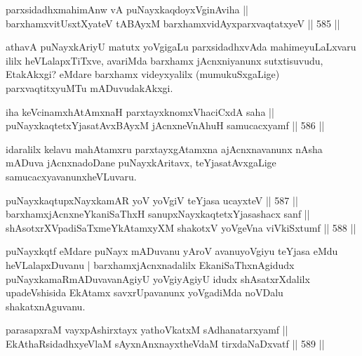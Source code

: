 \begin{shl}
parxsidadhxmahimAnw vA puNayxkaqdoyxVginAviha || \\
barxhamxvitUsxtXyateV tABAyxM barxhamxvidAyxparxvaqtatxyeV \hfill || 585 ||  
\end{shl}

\begin{artha}
athavA puNayxkAriyU matutx yoVgigaLu parxsidadhxvAda mahimeyuLaLxvaru
ililx heVLalapxTiTxve, avariMda barxhamx jAcnxniyanunx sutxtisuvudu,
EtakAkxgi? eMdare barxhamx videyxyalilx (mumukuSxgaLige)
parxvaqtitxyuMTu mADuvudakAkxgi.
\end{artha}


\begin{shl}
iha keVcinamxhAtAmxnaH parxtayxknomxVhaciCxdA saha || \\
puNayxkaqtetxYjasatAvxBAyxM jAcnxneVnA\s \s huH samucacxyamf \hfill || 586 ||  
\end{shl}

\begin{artha}
idaralilx kelavu mahAtamxru parxtayxgAtamxna ajAcnxnavanunx nAsha
mADuva jAcnxnadoDane puNayxkAritavx, teYjasatAvxgaLige samucacxyavanunx\break heVLuvaru.
\end{artha}


\begin{shl}
puNayxkaqtupxNayxkamAR yoV yoVgiV teYjasa ucayxteV \hfill || 587 ||  \\
barxhamxjAcnxneYkaniSaThxH sanupxNayxkaqtetxYjasashacx sanf || \\
shAsotxrXVpadiSaTxmeYkAtamxyXM shakotxV yoVgeVna viVkiSxtumf \hfill || 588 ||  
\end{shl}

\begin{artha}
puNayxkqtf eMdare puNayx mADuvanu yAroV avanu\break yoVgiyu teYjasa eMdu
heVLalapxDuvanu | barxhamxjAcnxnadalilx EkaniSaThxnAgidudx
puNayxkamaRmADuvavanAgiyU yoVgiyAgiyU idudx shAsatxrXdalilx
upadeVshisida EkAtamx savxrUpavanunx yoVgadiMda noVDalu shakatxnAguvanu.
\end{artha}

\begin{shl}
parasapxraM vayxpAshirxtayx yathoVkatxM sAdhanatarxyamf || \\
EkAthaRsidadhxyeV\s laM sAyxnAnxnayxtheVdaM tirxdaNaDxvatf \hfill || 589 ||  
\end{shl}

